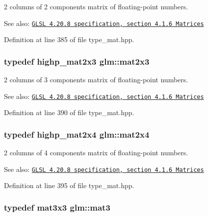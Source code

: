2 columns of 2 components matrix of floating-point numbers.

\begin{Desc}
\item[See also:]\href{http://www.opengl.org/registry/doc/GLSLangSpec.4.20.8.pdf}{\tt GLSL 4.20.8 specification, section 4.1.6 Matrices} \end{Desc}


Definition at line 385 of file type\_\-mat.hpp.\hypertarget{group__core__types_gea02797b8231f6dd9380345f6ff12155}{
\subsubsection[mat2x3]{\setlength{\rightskip}{0pt plus 5cm}typedef highp\_\-mat2x3 {\bf glm::mat2x3}}}
\label{group__core__types_gea02797b8231f6dd9380345f6ff12155}


2 columns of 3 components matrix of floating-point numbers.

\begin{Desc}
\item[See also:]\href{http://www.opengl.org/registry/doc/GLSLangSpec.4.20.8.pdf}{\tt GLSL 4.20.8 specification, section 4.1.6 Matrices} \end{Desc}


Definition at line 390 of file type\_\-mat.hpp.\hypertarget{group__core__types_ga9bfb36efaf88ecad32369ec8a01d901}{
\subsubsection[mat2x4]{\setlength{\rightskip}{0pt plus 5cm}typedef highp\_\-mat2x4 {\bf glm::mat2x4}}}
\label{group__core__types_ga9bfb36efaf88ecad32369ec8a01d901}


2 columns of 4 components matrix of floating-point numbers.

\begin{Desc}
\item[See also:]\href{http://www.opengl.org/registry/doc/GLSLangSpec.4.20.8.pdf}{\tt GLSL 4.20.8 specification, section 4.1.6 Matrices} \end{Desc}


Definition at line 395 of file type\_\-mat.hpp.\hypertarget{group__core__types_gdfaff2a7dce5cbf4e77a47ecea42ac5b}{
\subsubsection[mat3]{\setlength{\rightskip}{0pt plus 5cm}typedef mat3x3 {\bf glm::mat3}}}
\label{group__core__types_gdfaff2a7dce5cbf4e77a47ecea42ac5b}


